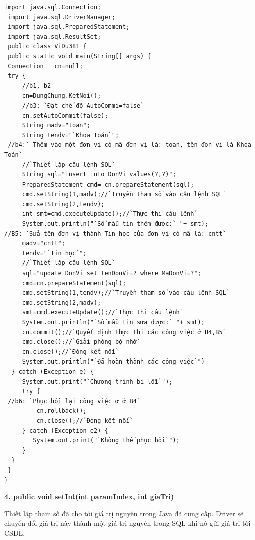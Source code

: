  \begin{lstlisting}[escapechar=`]
 import java.sql.Connection;
 import java.sql.DriverManager;
 import java.sql.PreparedStatement;
 import java.sql.ResultSet;
 public class ViDu381 {
 public static void main(String[] args) {
 Connection   cn=null;
 try { 
	 //b1, b2
	 cn=DungChung.KetNoi();
	 //b3: `Đặt chế độ AutoCommi=false`
	 cn.setAutoCommit(false);
	 String madv="toan";
	 String tendv="`Khoa Toán`";
 //b4:` Thêm vào một đơn vị có mã đơn vị là: toan, tên đơn vị là Khoa Toán`
	 //`Thiết lập câu lệnh SQL`
	 String sql="insert into DonVi values(?,?)";
	 PreparedStatement cmd= cn.prepareStatement(sql);
	 cmd.setString(1,madv);//`Truyền tham số vào câu lệnh SQL`
	 cmd.setString(2,tendv);
	 int smt=cmd.executeUpdate();//`Thực thi câu lệnh`
	 System.out.println("`Số mẫu tin thêm được:` "+ smt);
//B5: `Sửa tên đơn vị thành Tin học của đơn vị có mã là: cntt`
	 madv="cntt";
	 tendv="`Tin học`";
	 //`Thiết lập câu lệnh SQL`
	 sql="update DonVi set TenDonVi=? where MaDonVi=?";
	 cmd=cn.prepareStatement(sql);
	 cmd.setString(1,tendv);//`Truyền tham số vào câu lệnh SQL`
	 cmd.setString(2,madv);
	 smt=cmd.executeUpdate();//`Thực thi câu lệnh`
	 System.out.println("`Số mẫu tin sửa được:` "+ smt);
	 cn.commit();//`Quyết định thực thi các công việc ở B4,B5`
	 cmd.close();//`Giải phóng bộ nhớ`
	 cn.close();//`Đóng kết nối`
	 System.out.println("`Đã hoàn thành các công việc`")
  } catch (Exception e) {
	 System.out.print("`Chương trình bị lỗi`");
	 try { 
 //b6: `Phục hồi lại công việc ở ở B4`
		 cn.rollback();
		 cn.close();//`Đóng kết nối`
	 } catch (Exception e2) {
	 	System.out.print("`Không thể phục hồi`");
	 }
  }
 }
}
 \end{lstlisting}
 
\textbf{ 4. public void setInt(int paramIndex, int giaTri)}
 
 Thiết lập tham số đã cho tới giá trị nguyên trong Java đã cung cấp. Driver sẽ chuyển đổi giá trị này thành một giá trị nguyên trong SQL khi nó gửi giá trị tới CSDL.

